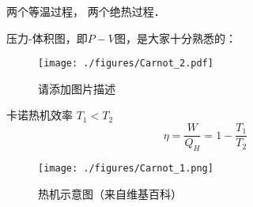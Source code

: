 
两个等温过程， 两个绝热过程．

压力-体积图，即$P-V$图，是大家十分熟悉的：
\begin{figure}[ht]
\centering
\texttt{[image: ./figures/Carnot\_2.pdf]}
\caption{请添加图片描述} \label{Carnot_fig2}
\end{figure}

卡诺热机效率 $T_1 < T_2$
\begin{equation}
\eta = \frac{W}{Q_H} = 1 - \frac{T_1}{T_2}
\end{equation}

\begin{figure}[ht]
\centering
\texttt{[image: ./figures/Carnot\_1.png]}
\caption{热机示意图（来自维基百科）} \label{Carnot_fig1}


\end{figure}
